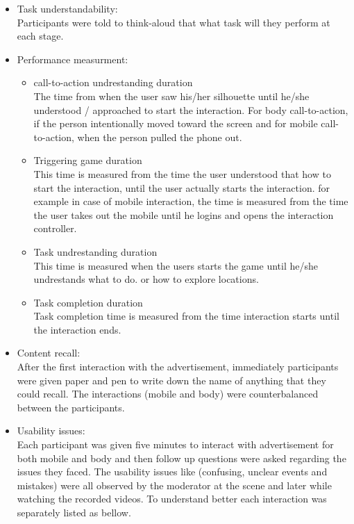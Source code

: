 \begin{itemize}

\item Task understandability: \\
Participants were told to think-aloud that what task will they perform at each stage. 


\item Performance measurment: \\

\begin{itemize}
\item call-to-action undrestanding duration \\
The time from when the user saw his/her silhouette until he/she understood / approached to start the interaction. For body call-to-action, if the person intentionally moved toward the screen and for mobile call-to-action, when the person pulled the phone out.

\item Triggering game duration\\
This time is measured from the time the user understood that how to start the interaction, until the user actually starts the interaction. for example in case of mobile interaction, the time is measured from the time the user takes out the mobile until he logins and opens the interaction controller.

\item Task undrestanding duration \\
This time is measured when the users starts the game until he/she undrestands what to do. or how to explore locations.

\item Task completion duration \\
Task completion time is measured from the time interaction starts until the interaction ends. 

\end{itemize}




\item Content recall: \\
After the first interaction with the advertisement, immediately participants were given paper and pen to write down the name of anything that they could recall. The interactions (mobile and body) were counterbalanced between the participants.


\item Usability issues: \\
Each participant was given five minutes to interact with advertisement for both mobile and body and then follow up questions were asked regarding the issues they faced.
The usability issues like (confusing, unclear events and mistakes) were all observed by the moderator at the scene and later while watching the recorded videos. To understand better each interaction was separately listed as bellow.

\end{itemize}

